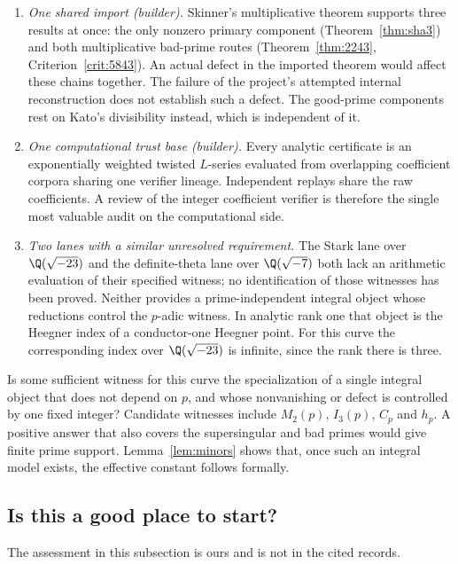 \begin{enumerate}[label=(\alph*),leftmargin=*]
\item \emph{One shared import (builder).} Skinner's multiplicative theorem supports three results at once: the only nonzero primary component (Theorem~\ref{thm:sha3}) and both multiplicative bad-prime routes (Theorem~\ref{thm:2243}, Criterion~\ref{crit:5843}). An actual defect in the imported theorem would affect these chains together. The failure of the project's attempted internal reconstruction does not establish such a defect. The good-prime components rest on Kato's divisibility instead, which is independent of it.

\item \emph{One computational trust base (builder).} Every analytic certificate is an exponentially weighted twisted $L$-series evaluated from overlapping coefficient corpora sharing one verifier lineage. Independent replays share the raw coefficients. A review of the integer coefficient verifier is therefore the single most valuable audit on the computational side.

\item \emph{Two lanes with a similar unresolved requirement.} The Stark lane over $\Q(\sqrt{-23})$ and the definite-theta lane over $\Q(\sqrt{-7})$ both lack an arithmetic evaluation of their specified witness; no identification of those witnesses has been proved. Neither provides a prime-independent integral object whose reductions control the $p$-adic witness. In analytic rank one that object is the Heegner index of a conductor-one Heegner point. For this curve the corresponding index over $\Q(\sqrt{-23})$ is infinite, since the rank there is three.
\end{enumerate}

\begin{question}[\cid{O.4}]\label{q:uniform}
Is some sufficient witness for this curve the specialization of a single integral object that does not depend on $p$, and whose nonvanishing or defect is controlled by one fixed integer? Candidate witnesses include $M_2(p)$, $I_3(p)$, $C_p$ and $h_p$. A positive answer that also covers the supersingular and bad primes would give finite prime support. Lemma~\ref{lem:minors} shows that, once such an integral model exists, the effective constant follows formally.
\end{question}

\subsection{Is this a good place to start?}
The assessment in this subsection is ours and is not in the cited records.

